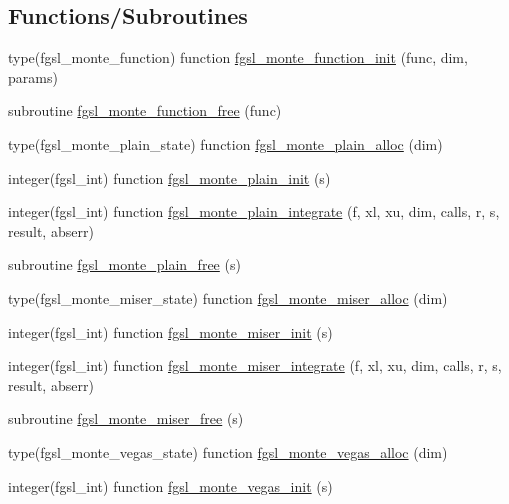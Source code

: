 \subsection*{Functions/\+Subroutines}
\begin{DoxyCompactItemize}
\item 
type(fgsl\+\_\+monte\+\_\+function) function \hyperlink{montecarlo_8finc_a15f091a9199b5feb5a89e48b523fec5e}{fgsl\+\_\+monte\+\_\+function\+\_\+init} (func, dim, params)
\item 
subroutine \hyperlink{montecarlo_8finc_a1cebacdc85ce175202a13211f5bc5d51}{fgsl\+\_\+monte\+\_\+function\+\_\+free} (func)
\item 
type(fgsl\+\_\+monte\+\_\+plain\+\_\+state) function \hyperlink{montecarlo_8finc_a78d51cf421999fedc5d8ea880fd5b010}{fgsl\+\_\+monte\+\_\+plain\+\_\+alloc} (dim)
\item 
integer(fgsl\+\_\+int) function \hyperlink{montecarlo_8finc_aa8dce2c1b9acbf0d5ad973b6a9fcb52c}{fgsl\+\_\+monte\+\_\+plain\+\_\+init} (s)
\item 
integer(fgsl\+\_\+int) function \hyperlink{montecarlo_8finc_a055f2d0383f12a1ec343e0e6389e7aac}{fgsl\+\_\+monte\+\_\+plain\+\_\+integrate} (f, xl, xu, dim, calls, r, s, result, abserr)
\item 
subroutine \hyperlink{montecarlo_8finc_ae8b9533f16107ce4fa773962d95ba21c}{fgsl\+\_\+monte\+\_\+plain\+\_\+free} (s)
\item 
type(fgsl\+\_\+monte\+\_\+miser\+\_\+state) function \hyperlink{montecarlo_8finc_a8cc7ef76d9ac9d08b0fd80d0956e53f4}{fgsl\+\_\+monte\+\_\+miser\+\_\+alloc} (dim)
\item 
integer(fgsl\+\_\+int) function \hyperlink{montecarlo_8finc_ab005757b4f0e3f08eb0595920d166393}{fgsl\+\_\+monte\+\_\+miser\+\_\+init} (s)
\item 
integer(fgsl\+\_\+int) function \hyperlink{montecarlo_8finc_aef41da72b6c8bd738bf13aa19ec02bd1}{fgsl\+\_\+monte\+\_\+miser\+\_\+integrate} (f, xl, xu, dim, calls, r, s, result, abserr)
\item 
subroutine \hyperlink{montecarlo_8finc_a3cf77f03d4317c892a8ca6045580aa2b}{fgsl\+\_\+monte\+\_\+miser\+\_\+free} (s)
\item 
type(fgsl\+\_\+monte\+\_\+vegas\+\_\+state) function \hyperlink{montecarlo_8finc_a104c37829cabd4b2c65dc53b4d428dad}{fgsl\+\_\+monte\+\_\+vegas\+\_\+alloc} (dim)
\item 
integer(fgsl\+\_\+int) function \hyperlink{montecarlo_8finc_a7b50efe16a1796a72f05bb26779481de}{fgsl\+\_\+monte\+\_\+vegas\+\_\+init} (s)

\end{DoxyCompactItemize}
